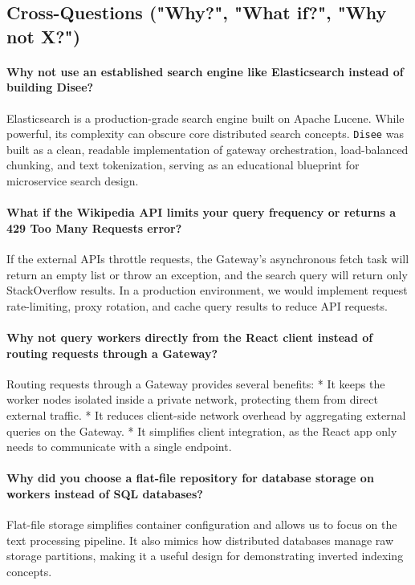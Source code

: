 \documentclass[11pt,a4paper]{article}
\begin{document}
\begin{itemize}
\newpage

\section{Cross-Questions ("Why?", "What if?", "Why not X?")}

\paragraph{Why not use an established search engine like Elasticsearch instead of building Disee?}
Elasticsearch is a production-grade search engine built on Apache Lucene. While powerful, its complexity can obscure core distributed search concepts. \texttt{Disee} was built as a clean, readable implementation of gateway orchestration, load-balanced chunking, and text tokenization, serving as an educational blueprint for microservice search design.

\paragraph{What if the Wikipedia API limits your query frequency or returns a 429 Too Many Requests error?}
If the external APIs throttle requests, the Gateway's asynchronous fetch task will return an empty list or throw an exception, and the search query will return only StackOverflow results. In a production environment, we would implement request rate-limiting, proxy rotation, and cache query results to reduce API requests.

\paragraph{Why not query workers directly from the React client instead of routing requests through a Gateway?}
Routing requests through a Gateway provides several benefits:
* It keeps the worker nodes isolated inside a private network, protecting them from direct external traffic.
* It reduces client-side network overhead by aggregating external queries on the Gateway.
* It simplifies client integration, as the React app only needs to communicate with a single endpoint.

\paragraph{Why did you choose a flat-file repository for database storage on workers instead of SQL databases?}
Flat-file storage simplifies container configuration and allows us to focus on the text processing pipeline. It also mimics how distributed databases manage raw storage partitions, making it a useful design for demonstrating inverted indexing concepts.


\end{itemize}
\end{document}
